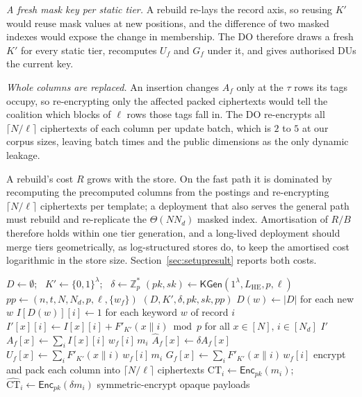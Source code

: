 \documentclass[a4paper,fleqn]{cas-dc}
\newcommand{\Enc}{\mathsf{Enc}}
\begin{document}
\emph{A fresh mask key per static tier.} A rebuild re-lays the record axis, so
reusing $K'$ would reuse mask values at new positions, and the difference of
two masked indexes would expose the change in membership. The DO therefore
draws a fresh $K'$ for every static tier, recomputes $U_f$ and $G_f$ under it,
and gives authorised DUs the current key.

\emph{Whole columns are replaced.} An insertion changes $A_f$ only at the
$\tau$ rows its tags occupy, so re-encrypting only the affected packed
ciphertexts would tell the coalition which blocks of $\ell$ rows those tags
fall in. The DO re-encrypts all $\lceil N/\ell\rceil$ ciphertexts of each
column per update batch, which is $2$ to $5$ at our corpus sizes, leaving
batch times and the public dimensions as the only dynamic leakage.

A rebuild's cost $R$ grows with the store. On the fast path it is dominated by
recomputing the precomputed columns from the postings and re-encrypting
$\lceil N/\ell\rceil$ ciphertexts per template; a deployment that also serves
the general path must rebuild and re-replicate the $\Theta(N N_d)$ masked
index. Amortisation of $R/B$ therefore holds within one tier generation, and a
long-lived deployment should merge tiers geometrically, as log-structured
stores do, to keep the amortised cost logarithmic in the store size.
Section~\ref{sec:setupresult} reports both costs.

\begin{algorithm}[t]
\footnotesize
\caption{Outsourcing at the data owner.}
\label{alg:outsource}
\begin{algorithmic}[1]
  \State $D\gets\emptyset$; \ $K'\gets\{0,1\}^\lambda$; \
         $\delta\gets\mathbb{Z}_p^{*}$
  \State $(pk,sk)\gets\mathsf{KGen}(1^\lambda,L_{\mathrm{HE}},p,\ell)$
  \State $pp\gets(n,t,N,N_d,p,\ell,\{w_f\})$
  \State \Return $(D,K',\delta,pk,sk,pp)$
\EndProcedure
\Statex
{}
  \State $D(w)\gets|D|$ for each new $w$
  \State $I[D(w)][i]\gets 1$ for each keyword $w$ of record $i$
  \State $I'[x][i]\gets I[x][i]+F'_{K'}(x\|i) \bmod p$
  \Statex \hfill for all $x\in[N],\,i\in[N_d]$
  \State \Return $I'$ 
\EndProcedure
\Statex
{}
    \State $A_f[x]\gets\sum_i I[x][i]\,w_f[i]\,m_i$
    \State $\widehat{A}_f[x]\gets\delta A_f[x]$
    \State $U_f[x]\gets\sum_i F'_{K'}(x\|i)\,w_f[i]\,m_i$
    \State $G_f[x]\gets\sum_i F'_{K'}(x\|i)\,w_f[i]$
    \State encrypt and pack each column into
    \Statex \hfill $\lceil N/\ell\rceil$ ciphertexts
  \EndFor
\EndProcedure
\Statex
{}
  \State $\text{CT}_i\gets\Enc_{pk}(m_i)$; \
         $\widehat{\text{CT}}_i\gets\Enc_{pk}(\delta m_i)$
  \State symmetric-encrypt opaque payloads
\EndProcedure
\end{algorithmic}
\end{algorithm}
\end{document}
